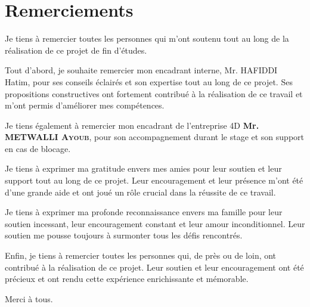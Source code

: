 \chapter*{Remerciements}

\begin{spacing}{1.25}

\hspace{0.6cm}Je tiens à remercier toutes les personnes qui m'ont soutenu tout au long de la réalisation de ce projet de fin d'études.
\newline

Tout d’abord, je souhaite remercier mon encadrant interne, Mr. HAFIDDI Hatim, pour ses conseils éclairés et son expertise tout au long de ce projet. Ses propositions constructives ont fortement contribué à la réalisation de ce travail et m’ont permis d’améliorer mes compétences.
\newline

Je tiens également à remercier mon encadrant de l'entreprise 4D \textbf{Mr. METWALLI \textsc{Ayoub}}, pour son accompagnement durant le stage et son support en cas de blocage. 
\newline


Je tiens à exprimer ma gratitude envers mes amies pour leur soutien et leur support tout au long de ce projet. Leur encouragement et leur présence m'ont été d'une grande aide et ont joué un rôle crucial dans la réussite de ce travail.
\newline

Je tiens à exprimer ma profonde reconnaissance envers ma famille pour leur soutien incessant, leur encouragement constant et leur amour inconditionnel. Leur soutien me pousse toujours à surmonter tous les défis rencontrés.
\newline

Enfin, je tiens à remercier toutes les personnes qui, de près ou de loin, ont contribué à la réalisation de ce projet. Leur soutien et leur encouragement ont été précieux et ont rendu cette expérience enrichissante et mémorable.
\newline

Merci à tous.

\end{spacing}